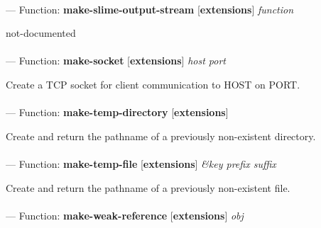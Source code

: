 \paragraph{}
\label{EXTENSIONS:MAKE-SLIME-OUTPUT-STREAM}
--- Function: \textbf{make-slime-output-stream} [\textbf{extensions}] \textit{function}

\begin{adjustwidth}{5em}{5em}
not-documented
\end{adjustwidth}

\paragraph{}
\label{EXTENSIONS:MAKE-SOCKET}
--- Function: \textbf{make-socket} [\textbf{extensions}] \textit{host port}

\begin{adjustwidth}{5em}{5em}
Create a TCP socket for client communication to HOST on PORT.
\end{adjustwidth}

\paragraph{}
\label{EXTENSIONS:MAKE-TEMP-DIRECTORY}
--- Function: \textbf{make-temp-directory} [\textbf{extensions}] \textit{}

\begin{adjustwidth}{5em}{5em}
Create and return the pathname of a previously non-existent directory.
\end{adjustwidth}

\paragraph{}
\label{EXTENSIONS:MAKE-TEMP-FILE}
--- Function: \textbf{make-temp-file} [\textbf{extensions}] \textit{\&key prefix suffix}

\begin{adjustwidth}{5em}{5em}
Create and return the pathname of a previously non-existent file.
\end{adjustwidth}

\paragraph{}
\label{EXTENSIONS:MAKE-WEAK-REFERENCE}
--- Function: \textbf{make-weak-reference} [\textbf{extensions}] \textit{obj}

